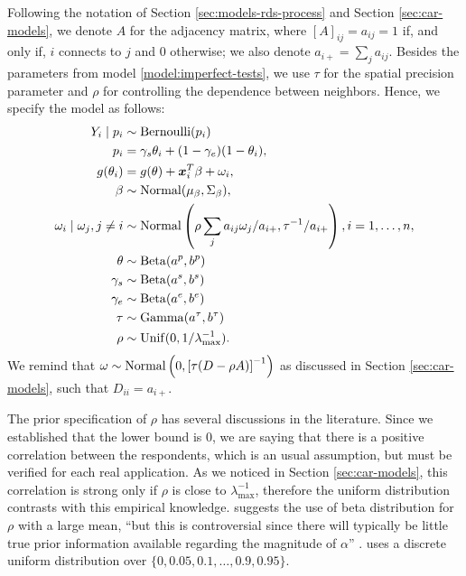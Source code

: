 Following the notation of Section \ref{sec:models-rds-process} and Section
\ref{sec:car-models}, we denote $A$ for the adjacency matrix, where $[A]_{ij}
=a_{ij} = 1$ if, and only if, $i$ connects to $j$ and $0$ otherwise; we also
denote $a_{i+} = \sum_j a_{ij}$. Besides the
parameters from model \ref{model:imperfect-tests}, we use $\tau$
for the spatial precision parameter and $\rho$ for controlling the dependence between neighbors. Hence, we specify
the model as follows:
\begin{equation}
  \label{model:imperfect-tests-rds}
  \begin{aligned}
    Y_i \mid p_i &\sim \operatorname{Bernoulli}(p_i) \\
    p_i &= \gamma_s\theta_i + (1-\gamma_e)(1 - \theta_i),  \\
    g(\theta_i) &= g(\theta) + \boldsymbol{x}_i^T\beta + \omega_i,  \\
    \beta  &\sim \operatorname{Normal}(\mu_{\beta}, \Sigma_{\beta}), \\ 
    \omega_i \mid \omega_j, j \neq i &\sim \operatorname{Normal}\left(\rho\sum_j a_{ij} \omega_j / a_{i+}, \tau^{-1} / a_{i+}\right), i = 1, \dots, n, 
    \\
    \theta &\sim \operatorname{Beta}(a^p, b^p) \\ 
    \gamma_s &\sim \operatorname{Beta}(a^s, b^s) \\
    \gamma_e &\sim \operatorname{Beta}(a^e, b^e) \\
    \tau &\sim \operatorname{Gamma}(a^{\tau}, b^{\tau}) \\
    \rho & \sim \operatorname{Unif}(0,1/\lambda_{\max}^{-1}).
  \end{aligned}  
\end{equation}
We remind that $\omega \sim \operatorname{Normal}\left(0, \left[\tau (D - \rho
A)\right]^{-1}\right)$ as discussed in Section \ref{sec:car-models}, such that
$D_{ii} = a_{i+}$. 

The prior specification of $\rho$ has several discussions in the literature.
Since we established that the lower bound is 0, we are saying that there is a
positive correlation between the respondents, which is an usual assumption,
but must be verified for each real application. As we noticed in Section
\ref{sec:car-models}, this correlation is strong only if $\rho$ is close to
$\lambda_{\max}^{-1}$, therefore the uniform distribution contrasts with
this empirical knowledge. \textcite[p. 177]{banerjee2003hierarchical} suggests
the use of beta distribution for $\rho$ with a large mean, ``but this is
controversial since there will typically be little true prior information
available regarding the magnitude of $\alpha$'' \cite[$\alpha$ is the
parameter $\rho$ in our notation.][p.
177]{banerjee2003hierarchical}. \textcite[p. 81]{lee2011comparison} uses a
discrete uniform distribution over $\{0, 0.05, 0.1, \dots, 0.9, 0.95\}$. 

